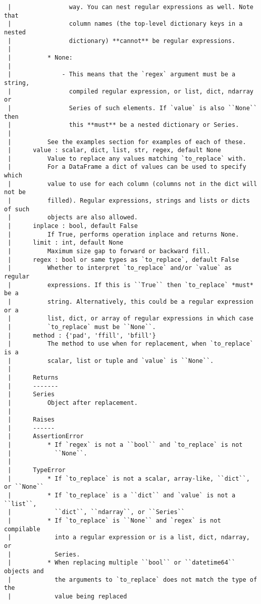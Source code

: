 \documentclass[
  letterpaper,
  DIV=11,
  numbers=noendperiod]{scrreprt}
\begin{document}
\begin{verbatim}
 |                way. You can nest regular expressions as well. Note that
 |                column names (the top-level dictionary keys in a nested
 |                dictionary) **cannot** be regular expressions.
 |      
 |          * None:
 |      
 |              - This means that the `regex` argument must be a string,
 |                compiled regular expression, or list, dict, ndarray or
 |                Series of such elements. If `value` is also ``None`` then
 |                this **must** be a nested dictionary or Series.
 |      
 |          See the examples section for examples of each of these.
 |      value : scalar, dict, list, str, regex, default None
 |          Value to replace any values matching `to_replace` with.
 |          For a DataFrame a dict of values can be used to specify which
 |          value to use for each column (columns not in the dict will not be
 |          filled). Regular expressions, strings and lists or dicts of such
 |          objects are also allowed.
 |      inplace : bool, default False
 |          If True, performs operation inplace and returns None.
 |      limit : int, default None
 |          Maximum size gap to forward or backward fill.
 |      regex : bool or same types as `to_replace`, default False
 |          Whether to interpret `to_replace` and/or `value` as regular
 |          expressions. If this is ``True`` then `to_replace` *must* be a
 |          string. Alternatively, this could be a regular expression or a
 |          list, dict, or array of regular expressions in which case
 |          `to_replace` must be ``None``.
 |      method : {'pad', 'ffill', 'bfill'}
 |          The method to use when for replacement, when `to_replace` is a
 |          scalar, list or tuple and `value` is ``None``.
 |      
 |      Returns
 |      -------
 |      Series
 |          Object after replacement.
 |      
 |      Raises
 |      ------
 |      AssertionError
 |          * If `regex` is not a ``bool`` and `to_replace` is not
 |            ``None``.
 |      
 |      TypeError
 |          * If `to_replace` is not a scalar, array-like, ``dict``, or ``None``
 |          * If `to_replace` is a ``dict`` and `value` is not a ``list``,
 |            ``dict``, ``ndarray``, or ``Series``
 |          * If `to_replace` is ``None`` and `regex` is not compilable
 |            into a regular expression or is a list, dict, ndarray, or
 |            Series.
 |          * When replacing multiple ``bool`` or ``datetime64`` objects and
 |            the arguments to `to_replace` does not match the type of the
 |            value being replaced

\end{verbatim}
\end{document}
